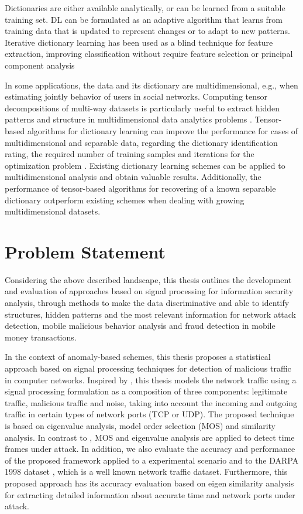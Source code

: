 Dictionaries are either available analytically, or can be learned from a suitable training set. DL can be formulated as an adaptive algorithm that learns from training data that is updated to represent changes or to adapt to new patterns. Iterative dictionary learning has been used as a blind technique for feature extraction, improving classification without require feature selection or principal component analysis

In some applications, the data and its dictionary are multidimensional, e.g., when estimating jointly behavior of users in social networks. Computing tensor decompositions of multi-way datasets is particularly useful to extract hidden patterns and structure in multidimensional data analytics problems \cite{kolda2009tensor}. Tensor-based algorithms for dictionary learning can improve the performance for cases of multidimensional and separable data, regarding the dictionary identification rating, the required number of training samples and iterations for the optimization problem \cite{roemer2014tensor}. Existing dictionary learning schemes can be applied to multidimensional analysis and obtain valuable results. Additionally, the performance of tensor-based algorithms for recovering of a known separable dictionary outperform existing schemes when dealing with growing multidimensional datasets.


\section{Problem Statement}
\label{sc:problems}

Considering the above described landscape, this thesis outlines the development and evaluation of approaches based on signal processing for information security analysis, through methods to make the data discriminative and able to identify structures, hidden patterns and the most relevant information for network attack detection, mobile malicious behavior analysis and fraud detection in mobile money transactions.

In the context of anomaly-based schemes, this thesis proposes a statistical approach based on signal processing techniques for detection of malicious traffic in computer networks. Inspired by \cite{david2011blind,da2012improved}, this thesis models the network traffic using a signal processing formulation as a composition of three components: legitimate traffic, malicious traffic and noise, taking into account the incoming and outgoing traffic in certain types of network ports (TCP or UDP). The proposed technique is based on eigenvalue analysis, model order selection (MOS) and similarity analysis. In contrast to \cite{david2011blind,da2012improved,tenorio2013greatest}, MOS and eigenvalue analysis are applied to detect time frames under attack. In addition, we also evaluate the accuracy and performance of the proposed framework applied to a experimental scenario and to the DARPA 1998 dataset \citep{osanaiye2016distributed}, which is a well known network traffic dataset. Furthermore, this proposed approach has its accuracy evaluation based on eigen similarity analysis for extracting detailed information about accurate time and network ports under attack.

